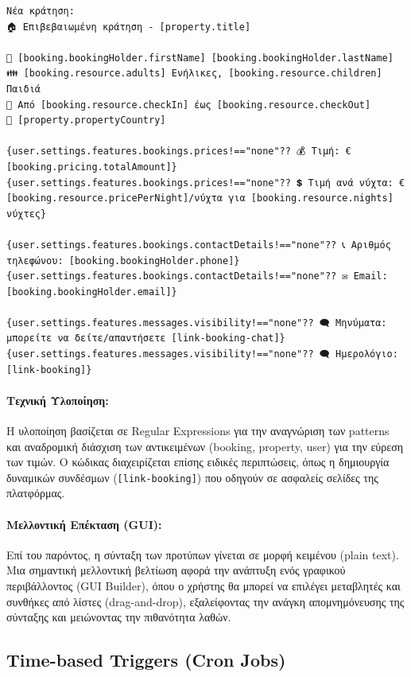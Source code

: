 \documentclass[
	12pt, %
	oneside, %
	greek,
	onehalfspacing, %
	liststotoc, %
	toctotoc, %
	parskip, %
	headsepline, %
]{MastersDoctoralThesis} %
\newcommand{\code}[1]{\texttt{#1}}
\begin{document}
\begin{lstlisting}[style=text,caption={Παράδειγμα Template για νέα κράτηση}]
Νέα κράτηση:
🏠 Επιβεβαιωμένη κράτηση - [property.title]

👤 [booking.bookingHolder.firstName] [booking.bookingHolder.lastName]
👪 [booking.resource.adults] Ενήλικες, [booking.resource.children] Παιδιά
📆 Από [booking.resource.checkIn] έως [booking.resource.checkOut]
📍 [property.propertyCountry]

{user.settings.features.bookings.prices!=="none"?? 💰 Τιμή: €[booking.pricing.totalAmount]}
{user.settings.features.bookings.prices!=="none"?? 💲 Τιμή ανά νύχτα: €[booking.resource.pricePerNight]/νύχτα για [booking.resource.nights] νύχτες}

{user.settings.features.bookings.contactDetails!=="none"?? 📞 Αριθμός τηλεφώνου: [booking.bookingHolder.phone]}
{user.settings.features.bookings.contactDetails!=="none"?? ✉ Email: [booking.bookingHolder.email]}

{user.settings.features.messages.visibility!=="none"?? 🗨 Μηνύματα: μπορείτε να δείτε/απαντήσετε [link-booking-chat]}
{user.settings.features.messages.visibility!=="none"?? 🗨 Ημερολόγιο: [link-booking]}
\end{lstlisting}

\paragraph{Τεχνική Υλοποίηση:}
Η υλοποίηση βασίζεται σε Regular Expressions για την αναγνώριση των patterns και αναδρομική διάσχιση των αντικειμένων (booking, property, user) για την εύρεση των τιμών. Ο κώδικας διαχειρίζεται επίσης ειδικές περιπτώσεις, όπως η δημιουργία δυναμικών συνδέσμων (\code{[link-booking]}) που οδηγούν σε ασφαλείς σελίδες της πλατφόρμας.

\paragraph{Μελλοντική Επέκταση (GUI):}
Επί του παρόντος, η σύνταξη των προτύπων γίνεται σε μορφή κειμένου (plain text). Μια σημαντική μελλοντική βελτίωση αφορά την ανάπτυξη ενός γραφικού περιβάλλοντος (GUI Builder), όπου ο χρήστης θα μπορεί να επιλέγει μεταβλητές και συνθήκες από λίστες (drag-and-drop), εξαλείφοντας την ανάγκη απομνημόνευσης της σύνταξης και μειώνοντας την πιθανότητα λαθών.

\subsection{Time-based Triggers (Cron Jobs)}
\label{subsec:time-based-triggers}
\end{document}

